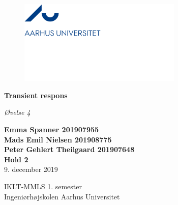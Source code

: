 \begin{titlepage}

\begin{center}

\begin{figure}
\includegraphics[height=4cm]{M_Fig/1_AU-Logo}
\end{figure}

\vspace*{4.5\baselineskip}
	
		{\Huge \textbf{Transient respons\\}}
		
		\large{\textit{Øvelse 4}}\\ 
		\vspace{0.5\baselineskip}
		
	
        \vspace*{6\baselineskip}

\normalsize{\textbf{Emma Spanner 201907955}}\\
		\normalsize{\textbf{Mads Emil Nielsen 201908775}}\\
		\normalsize{\textbf{Peter Gehlert Theilgaard 201907648}}\\
		
		\vspace{0,7\baselineskip}
		\small{\textbf{Hold 2}}\\
		
        \vspace{4\baselineskip}
		\large{9. december 2019}\\
		\vspace{1.5\baselineskip}
		
		\large{IKLT-MMLS 1. semester}\\
		\large{Ingeniørhøjskolen Aarhus Universitet}\\
		
		\vspace{1,5\baselineskip}
		
	\end{center}
\end{titlepage}
